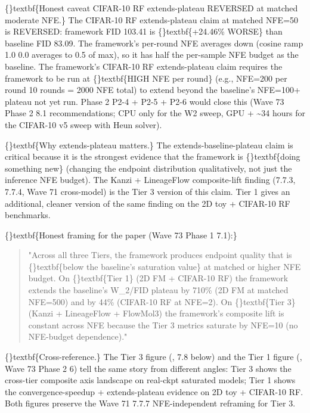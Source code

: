 \documentclass{article}
\begin{document}
\{\}textbf\{Honest caveat  CIFAR-10 RF extends-plateau REVERSED at matched moderate NFE.\} The CIFAR-10 RF extends-plateau claim at matched NFE=50 is REVERSED: framework FID 103.41 is \{\}textbf\{+24.46\% WORSE\} than baseline FID 83.09. The framework's per-round NFE averages down (cosine ramp 1.0  0.0 averages to 0.5 of max), so it has half the per-sample NFE budget as the baseline. The framework's CIFAR-10 RF extends-plateau claim requires the framework to be run at \{\}textbf\{HIGH NFE per round\} (e.g., NFE=200 per round  10 rounds = 2000 NFE total) to extend beyond the baseline's NFE=100+ plateau  not yet run. Phase 2 P2-4 + P2-5 + P2-6 would close this (Wave 73 Phase 2 8.1 recommendations; CPU only for the W2 sweep, GPU + \textasciitilde{}34 hours for the CIFAR-10 v5 sweep with Heun solver).

\{\}textbf\{Why extends-plateau matters.\} The extends-baseline-plateau claim is critical because it is the strongest evidence that the framework is \{\}textbf\{doing something new\} (changing the endpoint distribution qualitatively, not just the inference NFE budget). The Kanzi + LineageFlow composite-lift finding (7.7.3, 7.7.4, Wave 71 cross-model) is the Tier 3 version of this claim. Tier 1 gives an additional, cleaner version of the same finding on the 2D toy + CIFAR-10 RF benchmarks.

\{\}textbf\{Honest framing for the paper (Wave 73 Phase 1 7.1):\}

\begin{quote}
"Across all three Tiers, the framework produces endpoint
quality that is \{\}textbf\{below the baseline's saturation value\} at
matched or higher NFE budget. On \{\}textbf\{Tier 1\} (2D FM + CIFAR-10
RF) the framework extends the baseline's W\_2/FID plateau by
710\% (2D FM at matched NFE=500) and by 44\% (CIFAR-10 RF at
NFE=2). On \{\}textbf\{Tier 3\} (Kanzi + LineageFlow + FlowMol3) the
framework's composite lift is constant across NFE because the
Tier 3 metrics saturate by NFE=10 (no NFE-budget dependence)."
\end{quote}
\sloppy \{\}textbf\{Cross-reference.\} The Tier 3 figure (, 7.8 below) and the Tier 1 figure (, Wave 73 Phase 2 6) tell the same story from different angles: Tier 3 shows the cross-tier composite axis landscape on real-ckpt saturated models; Tier 1 shows the convergence-speedup + extends-plateau evidence on 2D toy + CIFAR-10 RF. Both figures preserve the Wave 71 7.7.7 NFE-independent reframing for Tier 3.
\end{document}
